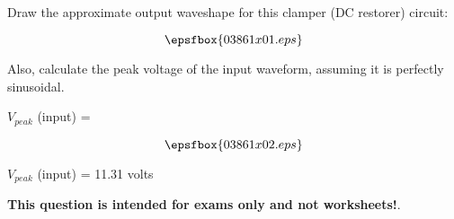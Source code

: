 

Draw the approximate output waveshape for this clamper (DC restorer) circuit:

$$\epsfbox{03861x01.eps}$$

Also, calculate the peak voltage of the input waveform, assuming it is perfectly sinusoidal.

\vskip 5pt

$V_{peak}$ (input) = 







$$\epsfbox{03861x02.eps}$$

$V_{peak}$ (input) = 11.31 volts







{\bf This question is intended for exams only and not worksheets!}.



